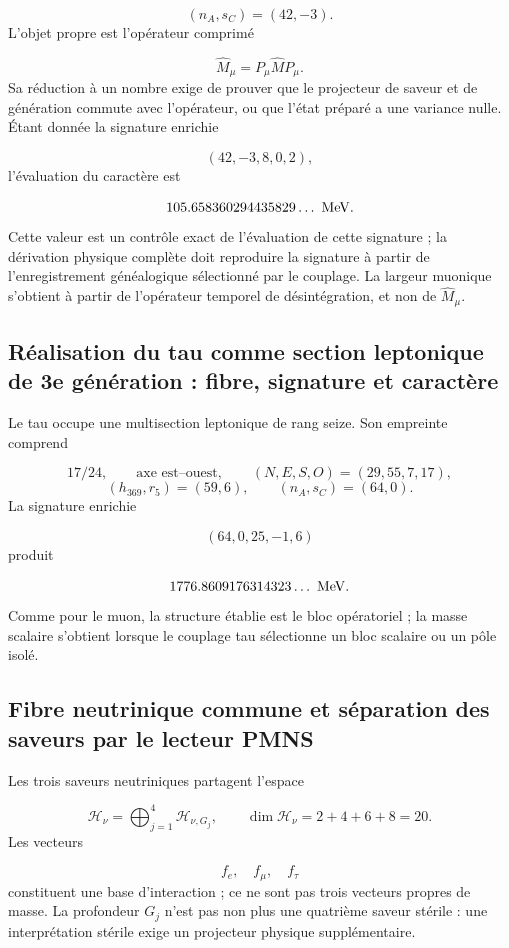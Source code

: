 \[
 (n_A,s_C)=(42,-3).
\]
L'objet propre est l'opérateur comprimé

\[
 \widehat M_\mu=P_\mu\widehat M P_\mu.
\]
Sa réduction à un nombre exige de prouver que le projecteur de saveur et de génération commute avec l'opérateur, ou que l'état préparé a une variance nulle. Étant donnée la signature enrichie

\[
 (42,-3,8,0,2),
\]
l'évaluation du caractère est

\[
 105.658360294435829\ldots\ {\rm MeV}.
\]
Cette valeur est un contrôle exact de l'évaluation de cette signature ; la dérivation physique complète doit reproduire la signature à partir de l'enregistrement généalogique sélectionné par le couplage. La largeur muonique s'obtient à partir de l'opérateur temporel de désintégration, et non de \(\widehat M_\mu\).

\subsection{Réalisation du tau comme section leptonique de 3e génération : fibre, signature et caractère}
Le tau occupe une multisection leptonique de rang seize. Son empreinte comprend

\[
 17/24,\qquad \text{axe est--ouest},\qquad
 (N,E,S,O)=(29,55,7,17),
\]
\[
 (h_{369},r_5)=(59,6),\qquad
 (n_A,s_C)=(64,0).
\]
La signature enrichie

\[
 (64,0,25,-1,6)
\]
produit

\[
 1776.8609176314323\ldots\ {\rm MeV}.
\]
Comme pour le muon, la structure établie est le bloc opératoriel ; la masse scalaire s'obtient lorsque le couplage tau sélectionne un bloc scalaire ou un pôle isolé.

\subsection{Fibre neutrinique commune et séparation des saveurs par le lecteur PMNS}
Les trois saveurs neutriniques partagent l'espace

\[
 \mathcal H_\nu=
 \bigoplus_{j=1}^{4}\mathcal H_{\nu,G_j},
\qquad
 \dim\mathcal H_\nu=2+4+6+8=20.
\]
Les vecteurs

\[
 f_e,\quad f_\mu,\quad f_\tau
\]
constituent une base d'interaction ; ce ne sont pas trois vecteurs propres de masse. La profondeur \(G_j\) n'est pas non plus une quatrième saveur stérile : une interprétation stérile exige un projecteur physique supplémentaire.

